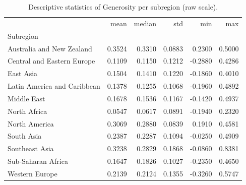 \begin{table}
\caption{Descriptive statistics of Generosity per subregion (raw scale).}
\label{tab:generosity-subregion}
\begin{tabular}{lrrrrr}
\toprule
 & mean & median & std & min & max \\
Subregion &  &  &  &  &  \\
\midrule
Australia and New Zealand & 0.3524 & 0.3310 & 0.0883 & 0.2300 & 0.5000 \\
Central and Eastern Europe & 0.1109 & 0.1150 & 0.1212 & -0.2880 & 0.4286 \\
East Asia & 0.1504 & 0.1410 & 0.1220 & -0.1860 & 0.4010 \\
Latin America and Caribbean & 0.1378 & 0.1255 & 0.1068 & -0.1960 & 0.4892 \\
Middle East & 0.1678 & 0.1536 & 0.1167 & -0.1420 & 0.4937 \\
North Africa & 0.0547 & 0.0617 & 0.0891 & -0.1940 & 0.2320 \\
North America & 0.3069 & 0.2880 & 0.0839 & 0.1910 & 0.4581 \\
South Asia & 0.2387 & 0.2287 & 0.1094 & -0.0250 & 0.4909 \\
Southeast Asia & 0.3238 & 0.2829 & 0.1868 & -0.0860 & 0.8381 \\
Sub-Saharan Africa & 0.1647 & 0.1826 & 0.1027 & -0.2350 & 0.4650 \\
Western Europe & 0.2139 & 0.2124 & 0.1355 & -0.3260 & 0.5747 \\
\bottomrule
\end{tabular}
\end{table}
